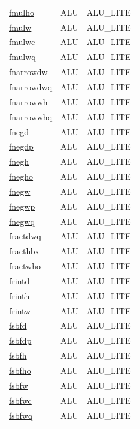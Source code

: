 \begin{small}
\begin{longtable}[l]{l l l}
\hyperlink{lvx.fmulho}{fmulho} & ALU & ALU\_LITE \\ 
\hyperlink{lvx.fmulw}{fmulw} & ALU & ALU\_LITE \\ 
\hyperlink{lvx.fmulwc}{fmulwc} & ALU & ALU\_LITE \\ 
\hyperlink{lvx.fmulwq}{fmulwq} & ALU & ALU\_LITE \\ 
\hyperlink{lvx.fnarrowdw}{fnarrowdw} & ALU & ALU\_LITE \\ 
\hyperlink{lvx.fnarrowdwq}{fnarrowdwq} & ALU & ALU\_LITE \\ 
\hyperlink{lvx.fnarrowwh}{fnarrowwh} & ALU & ALU\_LITE \\ 
\hyperlink{lvx.fnarrowwhq}{fnarrowwhq} & ALU & ALU\_LITE \\ 
\hyperlink{lvx.fnegd}{fnegd} & ALU & ALU\_LITE \\ 
\hyperlink{lvx.fnegdp}{fnegdp} & ALU & ALU\_LITE \\ 
\hyperlink{lvx.fnegh}{fnegh} & ALU & ALU\_LITE \\ 
\hyperlink{lvx.fnegho}{fnegho} & ALU & ALU\_LITE \\ 
\hyperlink{lvx.fnegw}{fnegw} & ALU & ALU\_LITE \\ 
\hyperlink{lvx.fnegwp}{fnegwp} & ALU & ALU\_LITE \\ 
\hyperlink{lvx.fnegwq}{fnegwq} & ALU & ALU\_LITE \\ 
\hyperlink{lvx.fractdwq}{fractdwq} & ALU & ALU\_LITE \\ 
\hyperlink{lvx.fracthbx}{fracthbx} & ALU & ALU\_LITE \\ 
\hyperlink{lvx.fractwho}{fractwho} & ALU & ALU\_LITE \\ 
\hyperlink{lvx.frintd}{frintd} & ALU & ALU\_LITE \\ 
\hyperlink{lvx.frinth}{frinth} & ALU & ALU\_LITE \\ 
\hyperlink{lvx.frintw}{frintw} & ALU & ALU\_LITE \\ 
\hyperlink{lvx.fsbfd}{fsbfd} & ALU & ALU\_LITE \\ 
\hyperlink{lvx.fsbfdp}{fsbfdp} & ALU & ALU\_LITE \\ 
\hyperlink{lvx.fsbfh}{fsbfh} & ALU & ALU\_LITE \\ 
\hyperlink{lvx.fsbfho}{fsbfho} & ALU & ALU\_LITE \\ 
\hyperlink{lvx.fsbfw}{fsbfw} & ALU & ALU\_LITE \\ 
\hyperlink{lvx.fsbfwc}{fsbfwc} & ALU & ALU\_LITE \\ 
\hyperlink{lvx.fsbfwq}{fsbfwq} & ALU & ALU\_LITE \\ 

\end{longtable}
\end{small}
